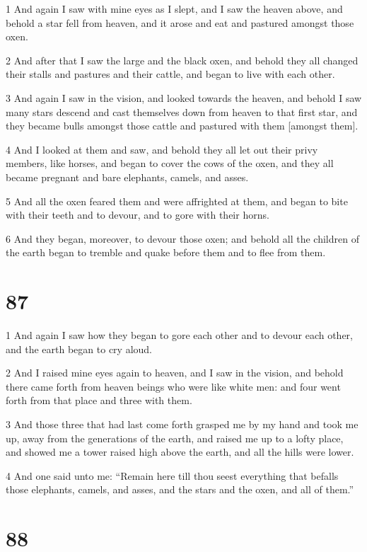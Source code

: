 \par 1 And again I saw with mine eyes as I slept, and I saw the heaven above, and behold a star fell from heaven, and it arose and eat and pastured amongst those oxen.
\par 2 And after that I saw the large and the black oxen, and behold they all changed their stalls and pastures and their cattle, and began to live with each other.
\par 3 And again I saw in the vision, and looked towards the heaven, and behold I saw many stars descend and cast themselves down from heaven to that first star, and they became bulls amongst those cattle and pastured with them [amongst them].
\par 4 And I looked at them and saw, and behold they all let out their privy members, like horses, and began to cover the cows of the oxen, and they all became pregnant and bare elephants, camels, and asses.
\par 5 And all the oxen feared them and were affrighted at them, and began to bite with their teeth and to devour, and to gore with their horns.
\par 6 And they began, moreover, to devour those oxen; and behold all the children of the earth began to tremble and quake before them and to flee from them.

\chapter{87}

\par 1 And again I saw how they began to gore each other and to devour each other, and the earth began to cry aloud.
\par 2 And I raised mine eyes again to heaven, and I saw in the vision, and behold there came forth from heaven beings who were like white men: and four went forth from that place and three with them.
\par 3 And those three that had last come forth grasped me by my hand and took me up, away from the generations of the earth, and raised me up to a lofty place, and showed me a tower raised high above the earth, and all the hills were lower.
\par 4 And one said unto me: “Remain here till thou seest everything that befalls those elephants, camels, and asses, and the stars and the oxen, and all of them.”

\chapter{88}

